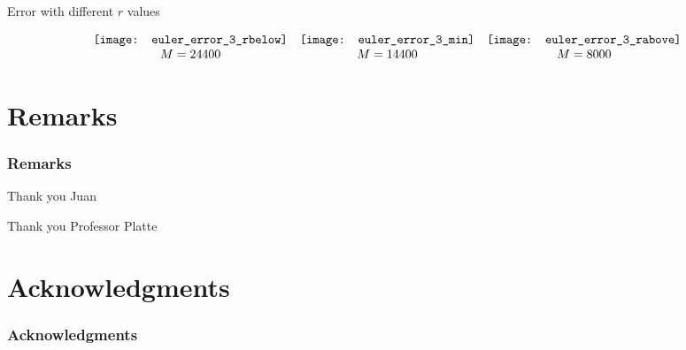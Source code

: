 \documentclass[compress]{beamer}
\begin{document}
\begin{frame}
\begin{center}
Error with different $r$ values
\end{center}
\[
\begin{array}{c c c}
\texttt{[image: euler\_error\_3\_rbelow]}	&	\texttt{[image: euler\_error\_3\_min]}	&	\texttt{[image: euler\_error\_3\_rabove]}		\\
M=24400				&		M=14400			&		M=8000
\end{array}
\]
\end{frame}
%
%
\section{Remarks}\label{Remarks}

\begin{frame}\frametitle{Remarks}
Thank you Juan
\vspace{.3in}

Thank you Professor Platte
\end{frame}

%
%
\section{Acknowledgments}\label{Acknowledgments}

\begin{frame}\frametitle{Acknowledgments}
\end{frame}

%
%
\end{document}

